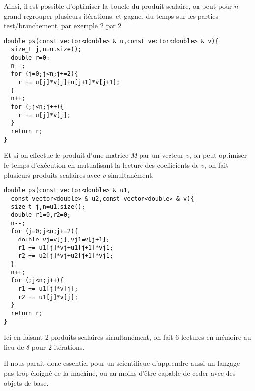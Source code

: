 \documentclass[12pt,a4paper]{book}
\begin{document}
\begin{giacjshere}
Ainsi, il est possible d'optimiser la boucle du produit scalaire,
on peut pour $n$ grand regrouper plusieurs it\'erations,
et gagner du temps sur les parties test/branchement, par exemple 2 par 2
\begin{verbatim}
double ps(const vector<double> & u,const vector<double> & v){
  size_t j,n=u.size();
  double r=0;
  n--;
  for (j=0;j<n;j+=2){
    r += u[j]*v[j]+u[j+1]*v[j+1];
  }
  n++;
  for (;j<n;j++){
    r += u[j]*v[j];
  }
  return r;
}
\end{verbatim}

Et si on effectue le produit d'une matrice $M$ par un vecteur $v$, on peut
optimiser le temps d'ex\'ecution en mutualisant la lecture des coefficients
de $v$, on fait plusieurs produits scalaires avec $v$ simultan\'ement.
\begin{verbatim}
double ps(const vector<double> & u1,
  const vector<double> & u2,const vector<double> & v){
  size_t j,n=u1.size();
  double r1=0,r2=0;
  n--;
  for (j=0;j<n;j+=2){
    double vj=v[j],vj1=v[j+1];
    r1 += u1[j]*vj+u1[j+1]*vj1;
    r2 += u2[j]*vj+u2[j+1]*vj1;
  }
  n++;
  for (;j<n;j++){
    r1 += u1[j]*v[j];
    r2 += u1[j]*v[j];
  }
  return r;
}
\end{verbatim}
Ici en faisant 2 produits scalaires simultan\'ement, 
on fait 6 lectures en m\'emoire au lieu de 8 pour 2 it\'erations.

Il nous parait donc essentiel pour un scientifique d'apprendre aussi
un langage pas trop \'eloign\'e de la machine, ou au moins
d'\^etre capable de coder avec des objets de base.
\end{giacjshere}
\end{document}
